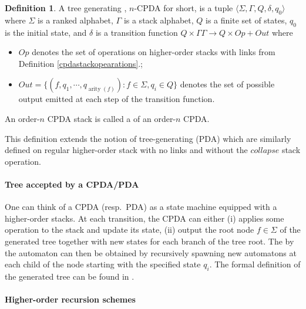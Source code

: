 \documentclass[a4paper]{article}[12pt]
\theoremstyle{remark}
\theoremstyle{definition}
\newtheorem{definition}{Definition}[section]
\newcommand\arity{\mathop{\mathrm{arity}}}
\begin{document}
\begin{definition}
	A tree generating , $n$-CPDA for short, is a tuple $\langle \Sigma, \Gamma,Q,\delta,q_0 \rangle$ where $\Sigma$ is a ranked alphabet,
	$\Gamma$ is a stack alphabet, $Q$ is a finite set of states, $q_0$
	is the initial state, and $\delta$ is a transition function $ Q \times \Gamma Γ \longrightarrow Q \times Op + Out$ where
	\begin{itemize}
		\item  $Op$ denotes the set of operations on higher-order stacks with links from Definition \ref{cpdastackopearations}.;
		\item $Out = \{(f, q_1 , \cdots ,q_{\arity(f)})  : f \in \Sigma, q_ i \in Q \}$ denotes the set of possible output emitted at each step of the transition function.
	\end{itemize}
	An order-$n$ CPDA stack is called a  of an order-$n$ CPDA.
\end{definition}

This definition extends the notion of tree-generating  (PDA) which are similarly defined on regular higher-order stack with no links and without the $collapse$ stack operation.

\paragraph{Tree accepted by a CPDA/PDA}

One can think of a CPDA (resp.\ PDA) as a state machine equipped with a higher-order stacks. At each transition, the CPDA can either (i) applies some operation to the stack and update its state, (ii) output the root node $f\in \Sigma$ of the generated tree together with new states for each branch of the tree root. The  by the automaton can then be obtained by recursively spawning new automatons at each child of the node starting with the specified state $q_i$.
The formal definition of the generated tree can be found in \cite{KNU02,hague-collaps-full}.


\paragraph{Higher-order recursion schemes} \hfill
\end{document}
